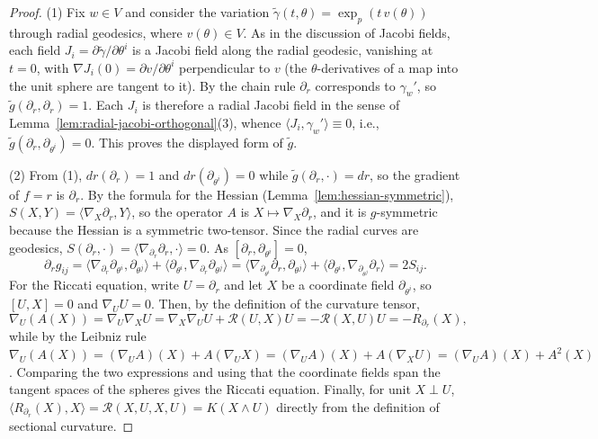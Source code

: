 \begin{proof}
(1) Fix $w\in V$ and consider the variation
$\tilde\gamma(t,\theta)=\exp_p(t\,v(\theta))$ through radial
geodesics, where $v(\theta)\in V$. As in the discussion of Jacobi
fields, each field
$J_i=\partial\tilde\gamma/\partial\theta^i$ is a Jacobi field along
the radial geodesic, vanishing at $t=0$, with $\nabla
J_i(0)=\partial v/\partial\theta^i$ perpendicular to $v$ (the
$\theta$-derivatives of a map into the unit sphere are tangent to
it). By the chain rule $\partial_r$ corresponds to
$\gamma_w'$, so $\tilde g(\partial_r,\partial_r)=1$. Each $J_i$ is
therefore a radial Jacobi field in the sense of
Lemma~\ref{lem:radial-jacobi-orthogonal}(3), whence
$\langle J_i,\gamma_w'\rangle\equiv0$, i.e.,
$\tilde g(\partial_r,\partial_{\theta^i})=0$. This proves the
displayed form of $\tilde g$.

(2) From (1), $dr(\partial_r)=1$ and $dr(\partial_{\theta^i})=0$
while $\tilde g(\partial_r,\cdot)=dr$, so the gradient of $f=r$ is
$\partial_r$. By the formula for the Hessian
(Lemma~\ref{lem:hessian-symmetric}),
$S(X,Y)=\langle\nabla_X\partial_r,Y\rangle$, so the operator $A$ is
$X\mapsto\nabla_X\partial_r$, and it is $g$-symmetric because the
Hessian is a symmetric two-tensor. Since the radial curves are
geodesics, $S(\partial_r,\cdot)
=\langle\nabla_{\partial_r}\partial_r,\cdot\rangle=0$. As
$[\partial_r,\partial_{\theta^i}]=0$,
$$\partial_rg_{ij}
=\langle\nabla_{\partial_r}\partial_{\theta^i},\partial_{\theta^j}\rangle
+\langle\partial_{\theta^i},\nabla_{\partial_r}\partial_{\theta^j}\rangle
=\langle\nabla_{\partial_{\theta^i}}\partial_r,\partial_{\theta^j}\rangle
+\langle\partial_{\theta^i},\nabla_{\partial_{\theta^j}}\partial_r\rangle
=2S_{ij}.$$
For the Riccati equation, write $U=\partial_r$ and let $X$ be a
coordinate field $\partial_{\theta^i}$, so $[U,X]=0$ and
$\nabla_UU=0$. Then, by the definition of the curvature tensor,
$$\nabla_U(A(X))=\nabla_U\nabla_XU
=\nabla_X\nabla_UU+{\mathcal R}(U,X)U=-{\mathcal R}(X,U)U
=-R_{\partial_r}(X),$$
while by the Leibniz rule
$\nabla_U(A(X))=(\nabla_UA)(X)+A(\nabla_UX)
=(\nabla_UA)(X)+A(\nabla_XU)=(\nabla_UA)(X)+A^2(X)$. Comparing the
two expressions and using that the coordinate fields span the
tangent spaces of the spheres gives the Riccati equation. Finally,
for unit $X\perp U$, $\langle R_{\partial_r}(X),X\rangle={\mathcal
R}(X,U,X,U)=K(X\wedge U)$ directly from the definition of sectional
curvature.


\end{proof}
